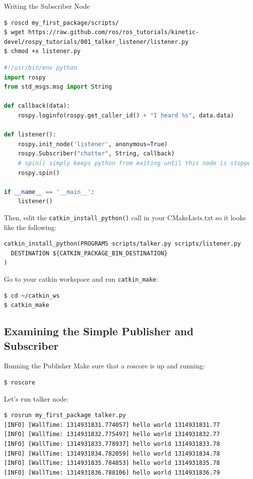 \begin{frame}{Writing the Subscriber Node}
\begin{lstlisting}[language=shell]
$ roscd my_first_package/scripts/
$ wget https://raw.github.com/ros/ros_tutorials/kinetic-devel/rospy_tutorials/001_talker_listener/listener.py
$ chmod +x listener.py
\end{lstlisting}

\begin{lstlisting}[language=python]
#!/usr/bin/env python
import rospy
from std_msgs.msg import String

def callback(data):
    rospy.loginfo(rospy.get_caller_id() + "I heard %s", data.data)
    
def listener():
    rospy.init_node('listener', anonymous=True)
    rospy.Subscriber("chatter", String, callback)
    # spin() simply keeps python from exiting until this node is stopped
    rospy.spin()

if __name__ == '__main__':
    listener()
\end{lstlisting}

Then, edit the \texttt{catkin\_install\_python()} call in your CMakeLists.txt so it looks like the following:

\begin{lstlisting}[language=syntax]
catkin_install_python(PROGRAMS scripts/talker.py scripts/listener.py
  DESTINATION ${CATKIN_PACKAGE_BIN_DESTINATION}
)
\end{lstlisting}

Go to your catkin workspace and run \texttt{catkin\_make}:

\begin{lstlisting}[language=shell]
$ cd ~/catkin_ws
$ catkin_make
\end{lstlisting}
\end{frame}

\subsection{Examining the Simple Publisher and Subscriber}

\begin{frame}[fragile]{Running the Publisher}
Make sure that a roscore is up and running:
\begin{lstlisting}[language=shell]
$ roscore
\end{lstlisting}

Let's run talker node:
\begin{lstlisting}[language=shell]
$ rosrun my_first_package talker.py
[INFO] [WallTime: 1314931831.774057] hello world 1314931831.77
[INFO] [WallTime: 1314931832.775497] hello world 1314931832.77
[INFO] [WallTime: 1314931833.778937] hello world 1314931833.78
[INFO] [WallTime: 1314931834.782059] hello world 1314931834.78
[INFO] [WallTime: 1314931835.784853] hello world 1314931835.78
[INFO] [WallTime: 1314931836.788106] hello world 1314931836.79
\end{lstlisting}
\end{frame}

